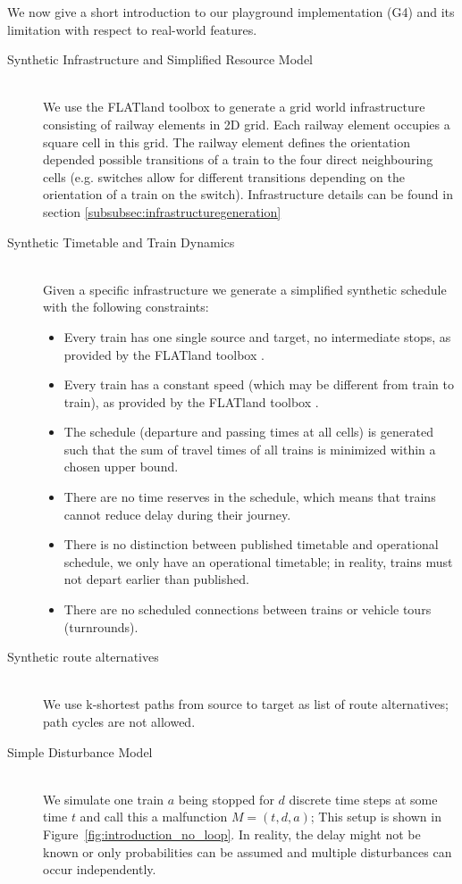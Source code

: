 \documentclass{article}
\begin{document}
We now give a short introduction to our playground implementation (G4) and its limitation with respect to real-world features.
\begin{description}
\item[Synthetic Infrastructure and Simplified Resource Model] \hfill \\
We use the FLATland toolbox \cite{aicrowdFLATland} to generate a grid world infrastructure consisting of railway elements in 2D grid. Each railway element occupies a square cell in this grid. The railway element defines the orientation depended possible transitions of a train to the four direct neighbouring cells (e.g. switches allow for different transitions depending on the orientation of a train on the switch). Infrastructure details can be found in section \ref{subsubsec:infrastructuregeneration}
\item[Synthetic Timetable and Train Dynamics] \hfill \\
Given a specific infrastructure we generate a simplified synthetic schedule with the following constraints:
\begin{itemize}
    \item Every train has one single source and target, no intermediate stops, as provided by the FLATland toolbox \cite{aicrowdFLATland}.
    \item Every train has a constant speed (which may be different from train to train), as provided by the FLATland toolbox \cite{aicrowdFLATland}.
    \item The schedule (departure and passing times at all cells) is generated such that the sum of travel times of all trains is minimized within a chosen upper bound.
    \item There are no time reserves in the schedule, which means that trains cannot reduce delay during their journey.
    \item There is no distinction between published timetable and operational schedule, we only have an operational timetable; in reality, trains must not depart earlier than published.
    \item There are no scheduled connections between trains or vehicle tours (turnrounds).
\end{itemize}
\item[Synthetic route alternatives] \hfill \\
We use k-shortest paths from source to target as list of route alternatives; path cycles are not allowed.
\item[Simple Disturbance Model] \hfill \\
We simulate one train $a$ being stopped for $d$ discrete time steps at some time $t$ and call this a malfunction $M=(t,d, a)$;  This setup is shown in Figure~\ref{fig:introduction_no_loop}. In reality, the delay might not be known or only probabilities can be assumed and multiple disturbances can occur independently.
\end{description}
\end{document}
